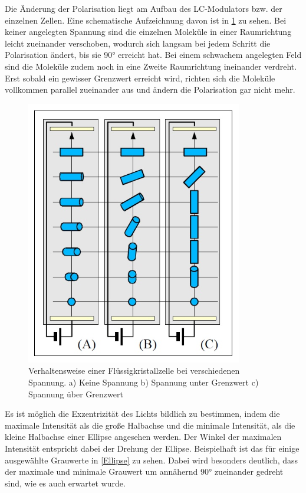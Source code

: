Die Änderung der Polarisation liegt am Aufbau des LC-Modulators bzw. der einzelnen Zellen. Eine schematische Aufzeichnung davon ist in \cref{LC-Modul} zu sehen. Bei keiner angelegten Spannung sind die einzelnen Moleküle in einer Raumrichtung leicht zueinander verschoben, wodurch sich langsam  bei jedem Schritt die Polarisation ändert, 
bis sie 90° erreicht hat. Bei einem schwachem angelegten Feld sind die Moleküle zudem noch in eine Zweite Raumrichtung ineinander verdreht. Erst sobald ein gewisser Grenzwert erreicht wird, richten sich die Moleküle vollkommen parallel zueinander aus und ändern die Polarisation gar nicht mehr. 

 
\begin{figure}[h!]
	\centering
	\includegraphics[scale=0.6]{LC-Zelle.png}
	\caption{Verhaltensweise einer Flüssigkristallzelle bei verschiedenen Spannung. a) Keine Spannung b) Spannung unter Grenzwert c) Spannung über Grenzwert}
	\label{LC-Modul}
\end{figure}


Es ist möglich die Exzentrizität des Lichts bildlich zu bestimmen, indem die maximale Intensität als die große Halbachse und die minimale Intensität, als die kleine Halbachse einer Ellipse angesehen werden. Der Winkel der maximalen Intensität entspricht dabei der Drehung der Ellipse. Beispielhaft ist das für einige ausgewählte Grauwerte in \cref{Ellipse} zu sehen. Dabei wird besonders deutlich, dass der maximale und minimale Grauwert um annähernd 90° zueinander gedreht sind, wie es auch erwartet wurde.

